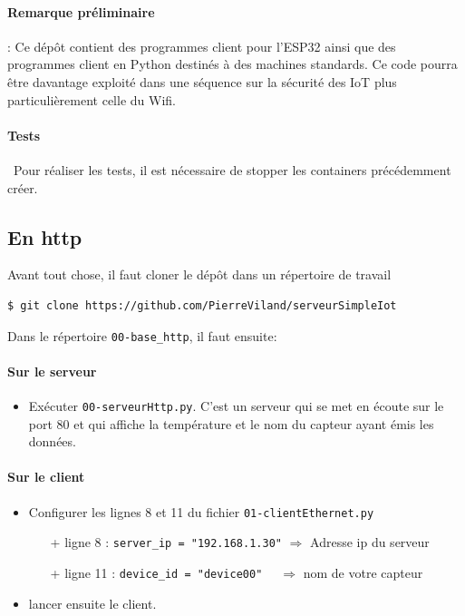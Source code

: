 \documentclass[french, 12pt]{article}%
\newcommand{\itemE}{\item[$\bullet$]}
\begin{document}
\paragraph{Remarque préliminaire} : Ce dépôt contient des programmes client pour l’ESP32 ainsi que des programmes client en Python destinés à des machines standards. Ce code pourra être davantage exploité dans une séquence sur la sécurité des IoT plus particulièrement celle du Wifi.  

\paragraph{Tests} \ 
Pour réaliser les tests, il est nécessaire de stopper les containers précédemment créer.


\subsection{En http}

Avant tout chose, il faut cloner le dépôt dans un répertoire de travail 
\begin{lstlisting}[style=commande]
$ git clone https://github.com/PierreViland/serveurSimpleIot
\end{lstlisting}


Dans le répertoire \verb?00-base_http?, il faut ensuite: 

\paragraph{Sur le serveur} 
\begin{itemize}
\itemE  Exécuter \verb?00-serveurHttp.py?. C'est un serveur qui se met en écoute sur le port 80 et qui affiche la température et le nom du capteur ayant émis les données.
\end{itemize}


\paragraph{Sur le client} 

\begin{itemize}
\itemE Configurer les lignes 8 et 11 du fichier \verb?01-clientEthernet.py?
	\begin{itemize}
	\item[+] ligne 8 : \verb?server_ip = "192.168.1.30"? $\Rightarrow$ Adresse ip du serveur
	\item[+] ligne 11 : \verb?device_id = "device00"  ? $\Rightarrow$ nom de votre capteur
	\end{itemize}
\itemE lancer ensuite le client.
\end{itemize}
\end{document}
